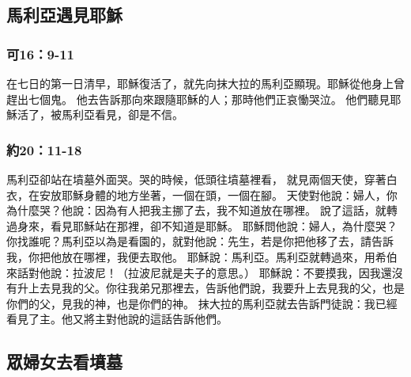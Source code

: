 \subsection{馬利亞遇見耶穌}

\subsubsection{可16：9-11}
在七日的第一日清早，耶穌復活了，就先向抹大拉的馬利亞顯現。耶穌從他身上曾趕出七個鬼。
他去告訴那向來跟隨耶穌的人；那時他們正哀慟哭泣。
他們聽見耶穌活了，被馬利亞看見，卻是不信。

\subsubsection{約20：11-18}
馬利亞卻站在墳墓外面哭。哭的時候，低頭往墳墓裡看，
就見兩個天使，穿著白衣，在安放耶穌身體的地方坐著，一個在頭，一個在腳。
天使對他說：婦人，你為什麼哭？他說：因為有人把我主挪了去，我不知道放在哪裡。
說了這話，就轉過身來，看見耶穌站在那裡，卻不知道是耶穌。
耶穌問他說：婦人，為什麼哭？你找誰呢？馬利亞以為是看園的，就對他說：先生，若是你把他移了去，請告訴我，你把他放在哪裡，我便去取他。
耶穌說：馬利亞。馬利亞就轉過來，用希伯來話對他說：拉波尼！（拉波尼就是夫子的意思。）
耶穌說：不要摸我，因我還沒有升上去見我的父。你往我弟兄那裡去，告訴他們說，我要升上去見我的父，也是你們的父，見我的神，也是你們的神。
抹大拉的馬利亞就去告訴門徒說：我已經看見了主。他又將主對他說的這話告訴他們。

\subsection{眾婦女去看墳墓}

